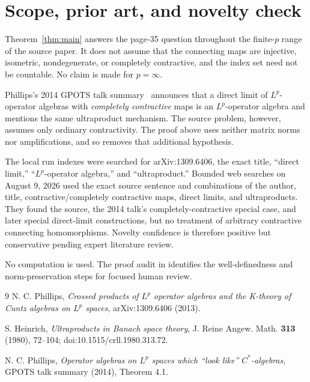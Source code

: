 \documentclass[11pt]{article}
\begin{document}
\section{Scope, prior art, and novelty check}

Theorem~\ref{thm:main} answers the page-35 question throughout the finite-$p$
range of the source paper.  It does not assume that the connecting maps are
injective, isometric, nondegenerate, or completely contractive, and the index
set need not be countable.  No claim is made for $p=\infty$.

Phillips's 2014 GPOTS talk summary~\cite[Theorem~4.1]{PhillipsTalk} announces
that a direct limit of $L^p$-operator algebras with \emph{completely
contractive} maps is an $L^p$-operator algebra and mentions the same
ultraproduct mechanism.  The source problem, however, assumes only ordinary
contractivity.  The proof above uses neither matrix norms nor amplifications,
and so removes that additional hypothesis.

The local run indexes were searched for arXiv:1309.6406, the exact title,
``direct limit,'' ``$L^p$-operator algebra,'' and ``ultraproduct.''  Bounded web
searches on August 9, 2026 used the exact source sentence and combinations of
the author, title, contractive/completely contractive maps, direct limits, and
ultraproducts.  They found the source, the 2014 talk's completely-contractive
special case, and later special direct-limit constructions, but no treatment
of arbitrary contractive connecting homomorphisms.  Novelty confidence is
therefore positive but conservative pending expert literature review.

No computation is used.  The proof audit in  identifies
the well-definedness and norm-preservation steps for focused human review.

\begin{thebibliography}{9}
N. C. Phillips,
\emph{Crossed products of $L^p$ operator algebras and the K-theory of Cuntz
algebras on $L^p$ spaces}, arXiv:1309.6406 (2013).

S. Heinrich,
\emph{Ultraproducts in Banach space theory}, J. Reine Angew. Math.
\textbf{313} (1980), 72--104; doi:10.1515/crll.1980.313.72.

N. C. Phillips,
\emph{Operator algebras on $L^p$ spaces which ``look like'' $C^*$-algebras},
GPOTS talk summary (2014), Theorem 4.1.
\end{thebibliography}
\end{document}
